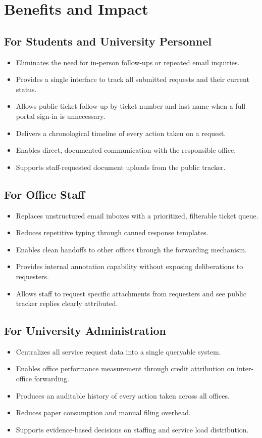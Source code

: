\documentclass[12pt,a4paper]{article}
\begin{document}
\section{Benefits and Impact}

\subsection{For Students and University Personnel}
\begin{itemize}
    \item Eliminates the need for in-person follow-ups or repeated email inquiries.
    \item Provides a single interface to track all submitted requests and their current status.
    \item Allows public ticket follow-up by ticket number and last name when a full portal sign-in is unnecessary.
    \item Delivers a chronological timeline of every action taken on a request.
    \item Enables direct, documented communication with the responsible office.
    \item Supports staff-requested document uploads from the public tracker.
\end{itemize}

\subsection{For Office Staff}
\begin{itemize}
    \item Replaces unstructured email inboxes with a prioritized, filterable ticket queue.
    \item Reduces repetitive typing through canned response templates.
    \item Enables clean handoffs to other offices through the forwarding mechanism.
    \item Provides internal annotation capability without exposing deliberations to requesters.
    \item Allows staff to request specific attachments from requesters and see public tracker replies clearly attributed.
\end{itemize}

\subsection{For University Administration}
\begin{itemize}
    \item Centralizes all service request data into a single queryable system.
    \item Enables office performance measurement through credit attribution on inter-office forwarding.
    \item Produces an auditable history of every action taken across all offices.
    \item Reduces paper consumption and manual filing overhead.
    \item Supports evidence-based decisions on staffing and service load distribution.
\end{itemize}
\end{document}

